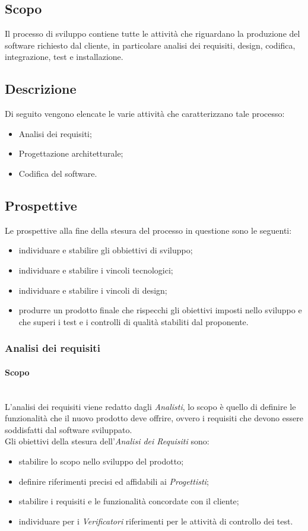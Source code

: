 \subsection{Scopo}\label{2.2.1}
Il processo di sviluppo contiene tutte le attività che riguardano la produzione del software richiesto dal cliente, in particolare analisi dei requisiti, design, codifica, integrazione, test e installazione.
\subsection{Descrizione}\label{2.2.2}
Di seguito vengono elencate le varie attività che caratterizzano tale processo:
\begin{itemize}
	\item Analisi dei requisiti;
	\item Progettazione architetturale;
	\item Codifica del software.
\end{itemize}
\subsection{Prospettive}\label{2.2.3}
Le prospettive alla fine della stesura del processo in questione sono le seguenti:
\begin{itemize}
	\item individuare e stabilire gli obbiettivi di sviluppo;
	\item individuare e stabilire i vincoli tecnologici;
	\item individuare e stabilire i vincoli di design;
	\item produrre un prodotto finale che rispecchi gli obiettivi imposti nello sviluppo e che superi i test e i controlli di qualità stabiliti dal proponente.
\end{itemize}
\subsubsection{Analisi dei requisiti}\label{2.2.3.1}
\paragraph{Scopo}\label{2.2.3.1.1}\mbox{}\\
L'analisi dei requisiti viene redatto dagli \textit{Analisti}, lo scopo è quello di definire le funzionalità che il nuovo prodotto deve offrire, ovvero i requisiti che devono essere soddisfatti dal software sviluppato.\\
Gli obiettivi della stesura dell'\textit{Analisi dei Requisiti} sono:
\begin{itemize}
	\item stabilire lo scopo nello sviluppo del prodotto;
	\item definire riferimenti precisi ed affidabili ai \textit{Progettisti};
	\item stabilire i requisiti e le funzionalità concordate con il cliente;
	\item individuare per i \textit{Verificatori} riferimenti per le attività di controllo dei test.
\end{itemize}
